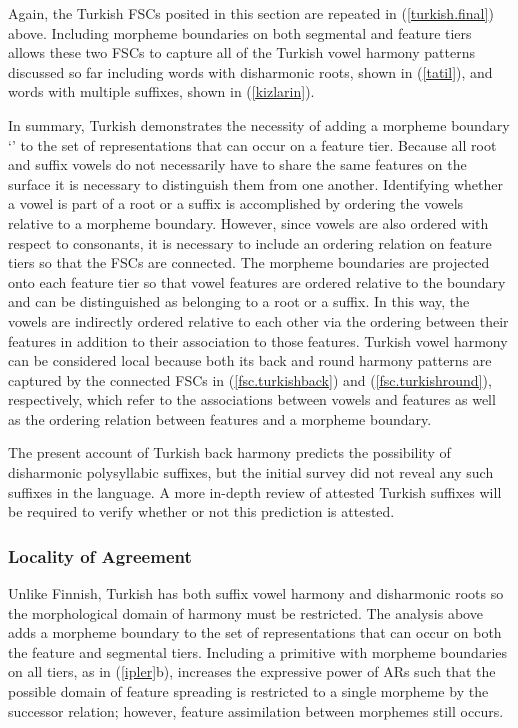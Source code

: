 \documentclass[,doc,floatsintext]{apa6}
\theoremstyle{definition}
\theoremstyle{definition}
\theoremstyle{definition}
\theoremstyle{remark}
\begin{document}
\noindent Again, the Turkish FSCs posited in this section are repeated
in (\ref{turkish.final}) above. Including morpheme boundaries on both
segmental and feature tiers allows these two FSCs to capture all of the
Turkish vowel harmony patterns discussed so far including words with
disharmonic roots, shown in (\ref{tatil}), and words with multiple
suffixes, shown in (\ref{kizlarin}).

In summary, Turkish demonstrates the necessity of adding a morpheme
boundary `\textipa{\LARGE+}' to the set of representations that can
occur on a feature tier. Because all root and suffix vowels do not
necessarily have to share the same features on the surface it is
necessary to distinguish them from one another. Identifying whether a
vowel is part of a root or a suffix is accomplished by ordering the
vowels relative to a morpheme boundary. However, since vowels are also
ordered with respect to consonants, it is necessary to include an
ordering relation on feature tiers so that the FSCs are connected. The
morpheme boundaries are projected onto each feature tier so that vowel
features are ordered relative to the boundary and can be distinguished
as belonging to a root or a suffix. In this way, the vowels are
indirectly ordered relative to each other via the ordering between their
features in addition to their association to those features. Turkish
vowel harmony can be considered local because both its back and round
harmony patterns are captured by the connected FSCs in
(\ref{fsc.turkishback}) and (\ref{fsc.turkishround}), respectively,
which refer to the associations between vowels and features as well as
the ordering relation between features and a morpheme boundary.

The present account of Turkish back harmony predicts the possibility of
disharmonic polysyllabic suffixes, but the initial survey did not reveal
any such suffixes in the language. A more in-depth review of attested
Turkish suffixes will be required to verify whether or not this
prediction is attested.

\subsubsection{Locality of Agreement}\label{locality-of-agreement}

Unlike Finnish, Turkish has both suffix vowel harmony and disharmonic
roots so the morphological domain of harmony must be restricted. The
analysis above adds a morpheme boundary to the set of representations
that can occur on both the feature and segmental tiers. Including a
primitive with morpheme boundaries on all tiers, as in (\ref{ipler}b),
increases the expressive power of ARs such that the possible domain of
feature spreading is restricted to a single morpheme by the successor
relation; however, feature assimilation between morphemes still occurs.
\end{document}
